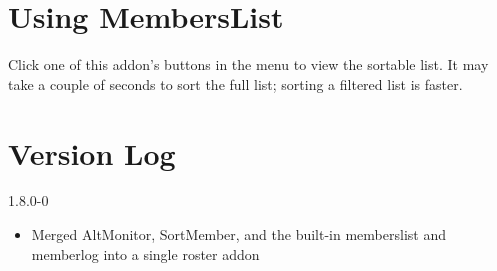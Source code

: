 \documentclass[12pt, a4paper]{article}
\begin{document}
\section{Using MembersList}
Click one of this addon's buttons in the menu to view the sortable list.
It may take a couple of seconds to sort the full list; sorting a filtered list
is faster.

\section{Version Log}

\begin{description}
\item{1.8.0-0}
\begin{itemize}
\item Merged AltMonitor, SortMember, and the built-in memberslist and memberlog
   into a single roster addon
\end{itemize}
\end{description}
\end{document}
